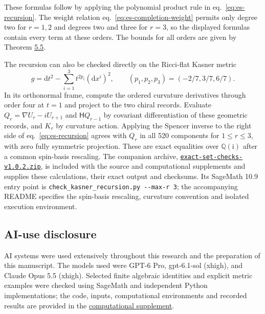 \documentclass[
  english,
  11pt,
  reqno]{amsart}
\begin{document}
These formulas follow by applying the polynomial product rule in
eq.~\ref{eq:es-recursion}. The weight relation
eq.~\ref{eq:es-completion-weight} permits only degree two for \(r=1,2\)
and degrees two and three for \(r=3\), so the displayed formulas contain
every term at these orders. The bounds for all orders are given by
Theorem \hyperref[thm:es-coefficients]{5.5}.

The recursion can also be checked directly on the Ricci-flat Kasner
metric \[
 g=\mathrm dt^2-\sum_{i=1}^3t^{2p_i}(\mathrm dx^i)^2,
 \qquad (p_1,p_2,p_3)=(-2/7,3/7,6/7).
\] In its orthonormal frame, compute the ordered curvature derivatives
through order four at \(t=1\) and project to the two chiral records.
Evaluate \(Q_r=\nabla U_r-iU_{r+1}\) and \(\mathsf H Q_{r-1}\) by
covariant differentiation of these geometric records, and \(K_r\) by
curvature action. Applying the Spencer inverse to the right side of
eq.~\ref{eq:es-recursion} agrees with \(Q_r\) in all 520 components for
\(1\le r\le3\), with zero fully symmetric projection. These are exact
equalities over \(\mathbb Q(\mathrm i)\) after a common spin-basis
rescaling. The companion archive,
\href{https://github.com/lioristhmus/local-analytic-einstein-metrics/raw/refs/tags/v1.0.2/paper/exact-set-checks-v1.0.2.zip}{\texttt{exact-set-checks-v1.0.2.zip}},
is included with the source and computational supplements and supplies
these calculations, their exact output and checksums. Its SageMath 10.9
entry point is \texttt{check\_kasner\_recursion.py\ -\/-max-r\ 3}; the
accompanying README specifies the spin-basis rescaling, curvature
convention and isolated execution environment.

\protect{}\label{sec:es-ai-use}

\subsection*{AI-use disclosure}\label{ai-use-disclosure}

AI systems were used extensively throughout this research and the
preparation of this manuscript. The models used were GPT-6 Pro,
gpt-6.1-sol (xhigh), and Claude Opus 5.5 (xhigh). Selected finite
algebraic identities and explicit metric examples were checked using
SageMath and independent Python implementations; the code, inputs,
computational environments and recorded results are provided in the
\href{https://github.com/lioristhmus/local-analytic-einstein-metrics/tree/v1.0.2/computations}{computational
supplement}.
\end{document}

